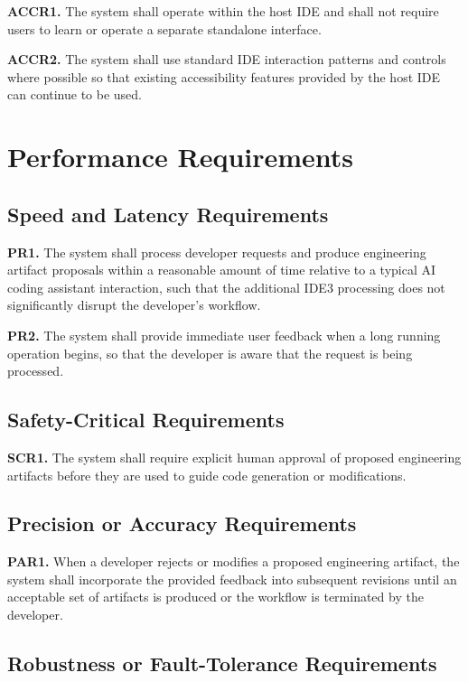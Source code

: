 \documentclass[12pt]{article}
\begin{document}
\noindent\textbf{ACCR1.} The system shall operate within the host IDE and shall not require users to learn or operate a separate standalone interface.

\noindent\textbf{ACCR2.} The system shall use standard IDE interaction patterns and controls where possible so that existing accessibility features provided by the host IDE can continue to be used.

\section{Performance Requirements}
\subsection{Speed and Latency Requirements}

\noindent\textbf{PR1.} The system shall process developer requests and produce engineering artifact proposals within a reasonable amount of time relative to a typical AI coding assistant interaction, such that the additional IDE3 processing does not significantly disrupt the developer's workflow.

\noindent\textbf{PR2.} The system shall provide immediate user feedback when a long running operation begins, so that the developer is aware that the request is being processed.

\subsection{Safety-Critical Requirements}

\noindent\textbf{SCR1.} The system shall require explicit human approval of proposed engineering artifacts before they are used to guide code generation or modifications.

\subsection{Precision or Accuracy Requirements}

\noindent\textbf{PAR1.} When a developer rejects or modifies a proposed engineering artifact, the system shall incorporate the provided feedback into subsequent revisions until an acceptable set of artifacts is produced or the workflow is terminated by the developer.

\subsection{Robustness or Fault-Tolerance Requirements}
\end{document}
